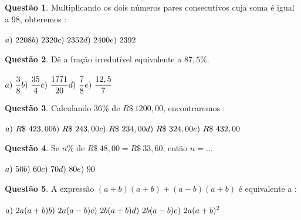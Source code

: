 \documentclass[11pt, twocolumn]{article}
\renewcommand{\=}[1]{\stackrel{#1}{=}} 																					%
\theoremstyle{definition}
\newtheorem{quest}{Quest\~ao}
\begin{document}
\hline
\vfill

\begin{quest}
	Multiplicando os dois n\'umeros pares consecutivos cuja soma \'e igual a $98$, obteremos : \\ \\
	\(\displaystyle a)\ 2208 \hfill b)\ 2320 \hfill c)\ 2352 \hfill d)\ 2400 \hfill e)\ 2392 \)
\end{quest}

\hline
\vfill

\begin{quest}
	D\^e a fra\c{c}\~ao irredut\'ivel equivalente a $87,5\%$. \\ \\
	\(\displaystyle a)\ \frac{3}{8} \hfill b)\ \frac{35}{4} \hfill c)\ \frac{1771}{20} \hfill d)\ \frac{7}{8} \hfill e)\ \frac{12,5}{7} \)
\end{quest}

\hline
\vfill

\begin{quest}
	Calculando $36\%$ de $R\$\ 1200,00$, encontraremos : \\ \\
	\(\displaystyle a)\ R\$\ 423,00 \hfill b)\ R\$\ 243,00 \hfill c)\ R\$\ 234,00 \hfill \\ d)\ R\$\ 324,00 \hfill e)\ R\$\ 432,00 \)
\end{quest}

\newpage

\begin{quest}
	Se $n\%$ de $R\$\ 48,00 = R\$\ 33,60$, ent\~ao $n = \dots$ \\ \\
	\(\displaystyle a)\ 50 \hfill b)\ 60 \hfill c)\ 70 \hfill d)\ 80 \hfill e)\ 90 \)
\end{quest}

\hline
\vfill

\begin{quest}
	A express\~ao \(\displaystyle (a+b)(a+b) + (a-b)(a+b)\) \'e equivalente a : \\ \\
	\(\displaystyle a)\ 2a(a+b) \hfill b)\ 2a(a-b) \hfill c)\ 2b(a+b) \hfill \\ \\ d)\ 2b(a-b) \hfill e)\ 2a(a+b)^2 \)
\end{quest}
\end{document}
